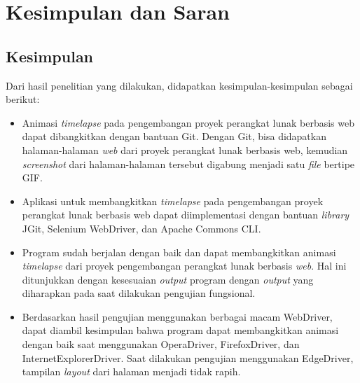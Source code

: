 \chapter{Kesimpulan dan Saran}
\label{chap:kesimpulan_dan_saran}

\section{Kesimpulan}
\label{sec:kesimpulan}
Dari hasil penelitian yang dilakukan, didapatkan kesimpulan-kesimpulan sebagai berikut:
\begin{itemize}
\item Animasi \textit{timelapse} pada pengembangan proyek perangkat lunak berbasis web dapat dibangkitkan dengan bantuan Git. Dengan Git, bisa didapatkan halaman-halaman \textit{web} dari proyek perangkat lunak berbasis web, kemudian \textit{screenshot} dari halaman-halaman tersebut digabung menjadi satu \textit{file} bertipe GIF.
\item  Aplikasi untuk membangkitkan \textit{timelapse} pada pengembangan proyek perangkat lunak berbasis web dapat diimplementasi dengan bantuan \textit{library} JGit, Selenium WebDriver, dan Apache Commons CLI.
\item Program sudah berjalan dengan baik dan dapat membangkitkan animasi \textit{timelapse} dari proyek pengembangan perangkat lunak berbasis \textit{web}. Hal ini ditunjukkan dengan kesesuaian \textit{output} program dengan \textit{output} yang diharapkan pada saat dilakukan pengujian fungsional.
\item Berdasarkan hasil pengujian menggunakan berbagai macam WebDriver, dapat diambil kesimpulan bahwa program dapat membangkitkan animasi dengan baik saat menggunakan OperaDriver, FirefoxDriver, dan InternetExplorerDriver. Saat dilakukan pengujian menggunakan EdgeDriver, tampilan \textit{layout} dari halaman menjadi tidak rapih.


\end{itemize}
